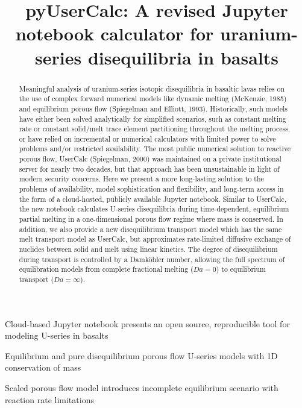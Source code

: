 \documentclass[draft]{agujournal2019}
\begin{document}
\title{pyUserCalc: A revised Jupyter notebook calculator for uranium-series disequilibria in basalts}
    
    

\pagecolor{white}

\begin{keypoints}
\item Cloud-based Jupyter notebook presents an open source, reproducible
tool for modeling U-series in basalts
\item Equilibrium and pure disequilibrium porous flow U-series models with
1D conservation of mass
\item Scaled porous flow model introduces incomplete equilibrium scenario
with reaction rate limitations
\end{keypoints}

    
    
\begin{abstract}
Meaningful analysis of uranium-series isotopic disequilibria in basaltic lavas relies on the use of complex forward numerical models like dynamic melting (McKenzie, 1985) and equilibrium porous flow (Spiegelman and Elliott, 1993). Historically, such models have either been solved analytically for simplified scenarios, such as constant melting rate or constant solid/melt trace element partitioning throughout the melting process, or have relied on incremental or numerical calculators with limited power to solve problems and/or restricted availability. The most public numerical solution to reactive porous flow, UserCalc (Spiegelman, 2000) was maintained on a private institutional server for nearly two decades, but that approach has been unsustainable in light of modern security concerns. Here we present a more long-lasting solution to the problems of availability, model sophistication and flexibility, and long-term access in the form of a cloud-hosted, publicly available Jupyter notebook. Similar to UserCalc, the new notebook calculates U-series disequilibria during time-dependent, equilibrium partial melting in a one-dimensional porous flow regime where mass is conserved. In addition, we also provide a new disequilibrium transport model which has the same melt transport model as UserCalc, but approximates rate-limited diffusive exchange of nuclides between solid and melt using linear kinetics. The degree of disequilibrium during transport is controlled by a Damköhler number, allowing  the full spectrum of equilibration models from complete fractional melting ($Da=0$) to equilibrium transport ($Da=\infty$).  
\end{abstract}
\end{document}
